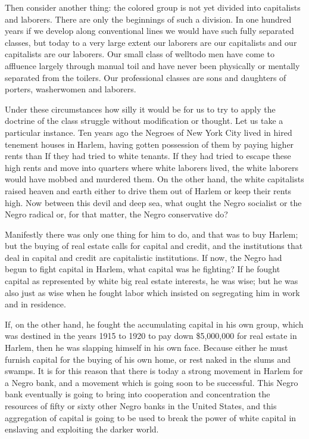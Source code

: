 \documentclass[letterpaper,10pt,english]{jupyterBook}
\begin{document}
\sphinxAtStartPar
Then consider another thing: the colored group is not yet divided into capitalists and laborers. There are only the beginnings of such a division. In one hundred years if we develop along conventional lines we would have such fully separated classes, but today to a very large extent our laborers are our capitalists and our capitalists are our laborers. Our small class of well\sphinxhyphen{}to\sphinxhyphen{}do men have come to affluence largely through manual toil and have never been physically or mentally separated from the toilers. Our professional classes are sons and daughters of porters, washerwomen and laborers.

\sphinxAtStartPar
Under these circumstances how silly it would be for us to try to apply the doctrine of the class struggle without modification or thought. Let us take a particular instance. Ten years ago the Negroes of New York City lived in hired tenement houses in Harlem, having gotten possession of them by paying higher rents than If they had tried to white tenants. If they had tried to escape these high rents and move into quarters where white laborers lived, the white laborers would have mobbed and murdered them. On the other hand, the white capitalists raised heaven and earth either to drive them out of Harlem or keep their rents high. Now between this devil and deep sea, what ought the Negro socialist or the Negro radical or, for that matter, the Negro conservative do?

\sphinxAtStartPar
Manifestly there was only one thing for him to do, and that was to buy Harlem; but the buying of real estate calls for capital and credit, and the institutions that deal in capital and credit are capitalistic institutions. If now, the Negro had begun to fight capital in Harlem, what capital was he fighting? If he fought capital as represented by white big real estate interests, he was wise; but he was also just as wise when he fought labor which insisted on segregating him in work and in residence.

\sphinxAtStartPar
If, on the other hand, he fought the accumulating capital in his own group, which was destined in the years 1915 to 1920 to pay down \$5,000,000 for real estate in Harlem, then he was slapping himself in his own face. Because either he must furnish capital for the buying of his own home, or rest naked in the slums and swamps. It is for this reason that there is today a strong movement in Harlem for a Negro bank, and a movement which is going soon to be successful. This Negro bank eventually is going to bring into cooperation and concentration the resources of fifty or sixty other Negro banks in the United States, and this aggregation of capital is going to be used to break the power of white capital in enslaving and exploiting the darker world.
\end{document}
